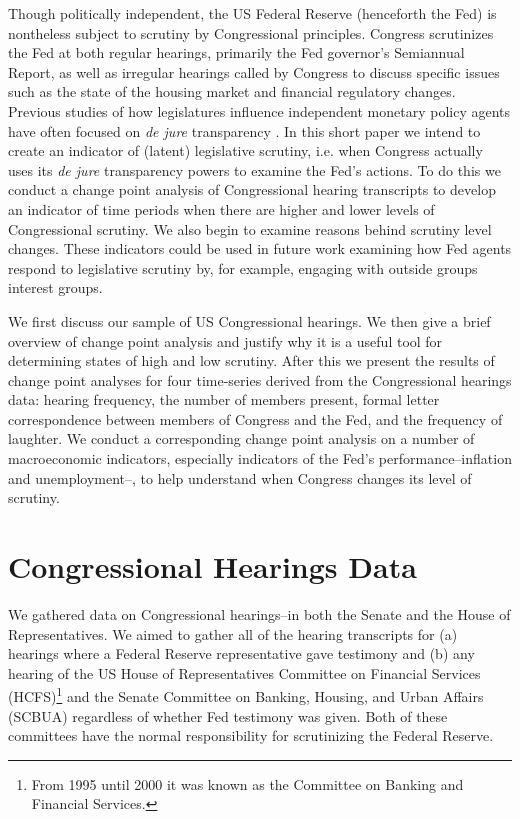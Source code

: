 \documentclass[a4paper]{article}\usepackage[]{graphicx}\usepackage[]{color}
\begin{document}
Though politically independent, the US Federal Reserve (henceforth the Fed) is nontheless subject to scrutiny by Congressional principles. Congress scrutinizes the Fed at both regular hearings, primarily the Fed governor's Semiannual Report, as well as irregular hearings called by Congress to discuss specific issues such as the state of the housing market and financial regulatory changes. Previous studies of how legislatures influence independent monetary policy agents have often focused on \emph{de jure} transparency \citep[for example][]{Stasavage2003}. In this short paper we intend to create an indicator of (latent) legislative scrutiny, i.e. when Congress actually uses its \emph{de jure} transparency powers to examine the Fed's actions. To do this we conduct a change point analysis \citep{SenSrivastava1975, EckleyFearnheadKillick2011,Killick2012, Matteson2014, Killick2013} of Congressional hearing transcripts to develop an indicator of time periods when there are higher and lower levels of Congressional scrutiny. We also begin to examine reasons behind scrutiny level changes. These indicators could be used in future work examining how Fed agents respond to legislative scrutiny by, for example, engaging with outside groups interest groups.

We first discuss our sample of US Congressional hearings. We then give a brief overview of change point analysis and justify why it is a useful tool for determining states of high and low scrutiny. After this we present the results of change point analyses for four time-series derived from the Congressional hearings data: hearing frequency, the number of members present, formal letter correspondence between members of Congress and the Fed, and the frequency of laughter. We conduct a corresponding change point analysis on a number of macroeconomic indicators, especially indicators of the Fed's performance--inflation and unemployment--, to help understand when Congress changes its level of scrutiny.

\section{Congressional Hearings Data}

We gathered data on Congressional hearings--in both the Senate and the House of Representatives. We aimed to gather all of the hearing transcripts for (a) hearings where a Federal Reserve representative gave testimony and (b) any hearing of the US House of Representatives Committee on Financial Services (HCFS)\footnote{From 1995 until 2000 it was known as the Committee on Banking and Financial Services.} and the Senate Committee on Banking, Housing, and Urban Affairs (SCBUA) regardless of whether Fed testimony was given. Both of these committees have the normal responsibility for scrutinizing the Federal Reserve.
\end{document}
